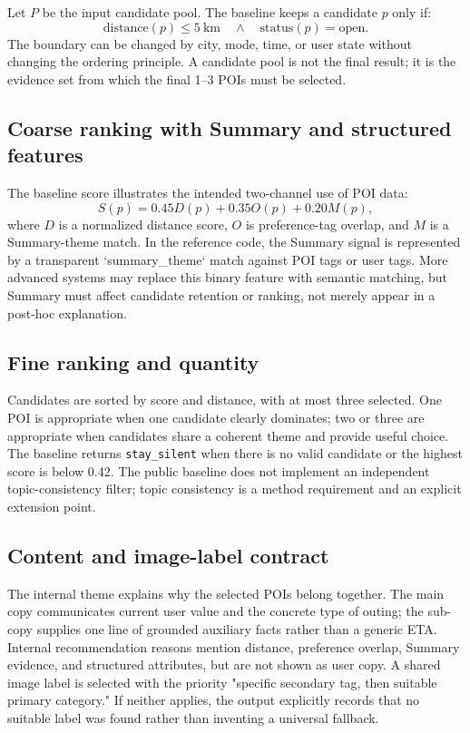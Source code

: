 \documentclass[10pt]{article}
\newcommand{\silent}{\texttt{stay\_silent}}
\begin{document}
Let $P$ be the input candidate pool. The baseline keeps a candidate $p$ only if:
\begin{equation}
  \text{distance}(p)\leq 5\ \text{km}\quad\land\quad\text{status}(p)=\text{open}.
\end{equation}
The boundary can be changed by city, mode, time, or user state without changing the ordering principle. A candidate pool is not the final result; it is the evidence set from which the final 1--3 POIs must be selected.

\subsection{Coarse ranking with Summary and structured features}

The baseline score illustrates the intended two-channel use of POI data:
\begin{equation}
  S(p)=0.45D(p)+0.35O(p)+0.20M(p),
\end{equation}
where $D$ is a normalized distance score, $O$ is preference-tag overlap, and $M$ is a Summary-theme match. In the reference code, the Summary signal is represented by a transparent `summary\_theme` match against POI tags or user tags. More advanced systems may replace this binary feature with semantic matching, but Summary must affect candidate retention or ranking, not merely appear in a post-hoc explanation.

\subsection{Fine ranking and quantity}

Candidates are sorted by score and distance, with at most three selected. One POI is appropriate when one candidate clearly dominates; two or three are appropriate when candidates share a coherent theme and provide useful choice. The baseline returns \silent{} when there is no valid candidate or the highest score is below 0.42. The public baseline does not implement an independent topic-consistency filter; topic consistency is a method requirement and an explicit extension point.

\subsection{Content and image-label contract}

The internal theme explains why the selected POIs belong together. The main copy communicates current user value and the concrete type of outing; the sub-copy supplies one line of grounded auxiliary facts rather than a generic ETA. Internal recommendation reasons mention distance, preference overlap, Summary evidence, and structured attributes, but are not shown as user copy. A shared image label is selected with the priority "specific secondary tag, then suitable primary category." If neither applies, the output explicitly records that no suitable label was found rather than inventing a universal fallback.
\end{document}
